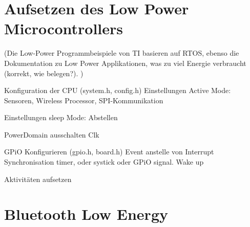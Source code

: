 \section{Aufsetzen des Low Power Microcontrollers}
(Die Low-Power Programmbeispiele von TI basieren auf RTOS, ebenso die Dokumentation zu Low Power Applikationen, was zu viel Energie verbraucht (korrekt, wie belegen?). )

Konfiguration der CPU (system.h, config.h)
Einstellungen Active Mode: Sensoren, Wireless Processor, SPI-Kommunikation

Einstellungen sleep Mode: Abstellen

PowerDomain ausschalten
Clk

GPiO Konfigurieren (gpio.h, board.h)
Event anstelle von Interrupt
Synchronisation
timer, oder systick oder GPiO signal. Wake up

Aktivitäten aufsetzen






\section{Bluetooth Low Energy}\label{t_ble} 







